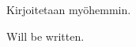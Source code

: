 %
%

\begin{fiabstract}
    Kirjoitetaan myöhemmin.



%
\end{fiabstract}


\begin{enabstract}
Will be written.
\end{enabstract}
